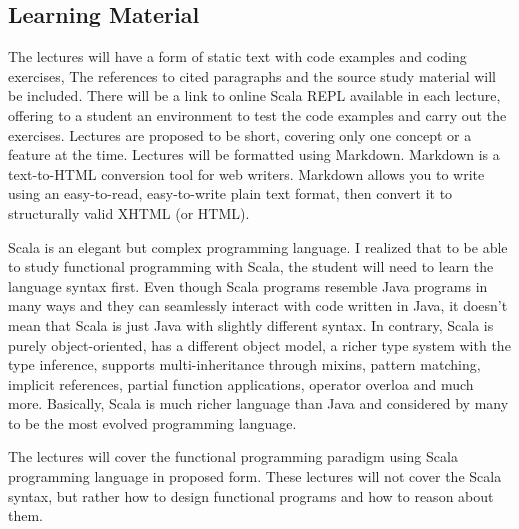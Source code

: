 \documentclass[12pt,twoside,a4paper]{report}
\begin{document}
\subsection{Learning Material}\label{3.2.1}
The lectures will have a form of static text with code examples and coding exercises, The references to cited paragraphs and the source study material will be included. There will be a link to online Scala REPL\cite{18} available in each lecture, offering to a student an environment to test the code examples and carry out the exercises. Lectures are proposed to be short, covering only one concept or a feature at the time. Lectures will be formatted using Markdown. Markdown is a text-to-HTML conversion tool for web writers. Markdown allows you to write using an easy-to-read, easy-to-write plain text format, then convert it to structurally valid XHTML (or HTML)\cite{20}.\par
Scala is an elegant but complex programming language. I realized that to be able to study functional programming with Scala, the student will need to learn the language syntax first. Even though Scala programs resemble Java programs in many ways and they can seamlessly interact with code written in Java\cite{17}, it doesn't mean that Scala is just Java with slightly different syntax. In contrary, Scala is purely object-oriented, has a different object model, a richer type system with the type inference, supports multi-inheritance through mixins, pattern matching, implicit references, partial function applications, operator overloa and much more. Basically, Scala is much richer language than Java and considered by many to be the most evolved programming language.\par
The lectures will cover the functional programming paradigm using Scala programming language in proposed form. These lectures will not cover the Scala syntax, but rather how to design functional programs and how to reason about them.
\end{document}

